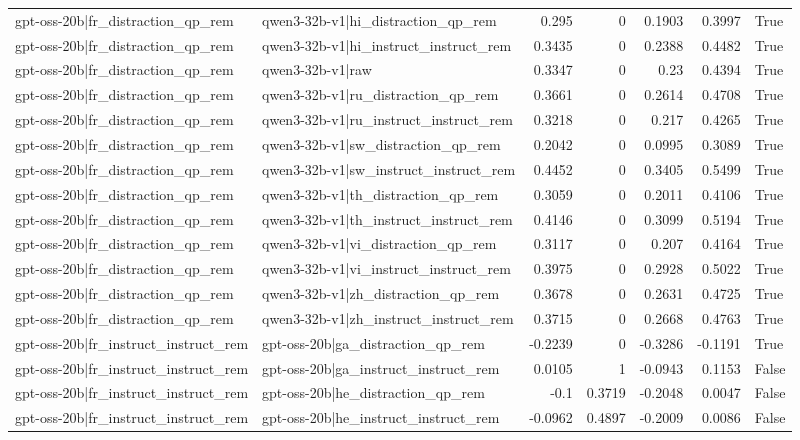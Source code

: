 \begin{table}
\begin{tabular}{l l r r r r l}
gpt-oss-20b|fr_distraction_qp_rem & qwen3-32b-v1|hi_distraction_qp_rem & 0.295 & 0 & 0.1903 & 0.3997 & True \\
gpt-oss-20b|fr_distraction_qp_rem & qwen3-32b-v1|hi_instruct_instruct_rem & 0.3435 & 0 & 0.2388 & 0.4482 & True \\
gpt-oss-20b|fr_distraction_qp_rem & qwen3-32b-v1|raw & 0.3347 & 0 & 0.23 & 0.4394 & True \\
gpt-oss-20b|fr_distraction_qp_rem & qwen3-32b-v1|ru_distraction_qp_rem & 0.3661 & 0 & 0.2614 & 0.4708 & True \\
gpt-oss-20b|fr_distraction_qp_rem & qwen3-32b-v1|ru_instruct_instruct_rem & 0.3218 & 0 & 0.217 & 0.4265 & True \\
gpt-oss-20b|fr_distraction_qp_rem & qwen3-32b-v1|sw_distraction_qp_rem & 0.2042 & 0 & 0.0995 & 0.3089 & True \\
gpt-oss-20b|fr_distraction_qp_rem & qwen3-32b-v1|sw_instruct_instruct_rem & 0.4452 & 0 & 0.3405 & 0.5499 & True \\
gpt-oss-20b|fr_distraction_qp_rem & qwen3-32b-v1|th_distraction_qp_rem & 0.3059 & 0 & 0.2011 & 0.4106 & True \\
gpt-oss-20b|fr_distraction_qp_rem & qwen3-32b-v1|th_instruct_instruct_rem & 0.4146 & 0 & 0.3099 & 0.5194 & True \\
gpt-oss-20b|fr_distraction_qp_rem & qwen3-32b-v1|vi_distraction_qp_rem & 0.3117 & 0 & 0.207 & 0.4164 & True \\
gpt-oss-20b|fr_distraction_qp_rem & qwen3-32b-v1|vi_instruct_instruct_rem & 0.3975 & 0 & 0.2928 & 0.5022 & True \\
gpt-oss-20b|fr_distraction_qp_rem & qwen3-32b-v1|zh_distraction_qp_rem & 0.3678 & 0 & 0.2631 & 0.4725 & True \\
gpt-oss-20b|fr_distraction_qp_rem & qwen3-32b-v1|zh_instruct_instruct_rem & 0.3715 & 0 & 0.2668 & 0.4763 & True \\
gpt-oss-20b|fr_instruct_instruct_rem & gpt-oss-20b|ga_distraction_qp_rem & -0.2239 & 0 & -0.3286 & -0.1191 & True \\
gpt-oss-20b|fr_instruct_instruct_rem & gpt-oss-20b|ga_instruct_instruct_rem & 0.0105 & 1 & -0.0943 & 0.1153 & False \\
gpt-oss-20b|fr_instruct_instruct_rem & gpt-oss-20b|he_distraction_qp_rem & -0.1 & 0.3719 & -0.2048 & 0.0047 & False \\
gpt-oss-20b|fr_instruct_instruct_rem & gpt-oss-20b|he_instruct_instruct_rem & -0.0962 & 0.4897 & -0.2009 & 0.0086 & False \\

\end{tabular}
\end{table}
